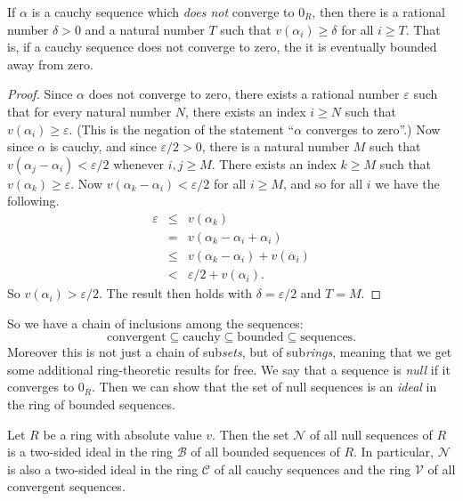 \begin{prop} \label{prop:cauchy-bound-away-from-zero}
If \(\alpha\) is a cauchy sequence which \emph{does not} converge to \(0_R\), then there is a rational number \(\delta > 0\) and a natural number \(T\) such that \(v(\alpha_i) \geq \delta\) for all \(i \geq T\).
That is, if a cauchy sequence does not converge to zero, the it is eventually bounded away from zero.
\end{prop}

\begin{proof}
Since \(\alpha\) does not converge to zero, there exists a rational number \(\varepsilon\) such that for every natural number \(N\), there exists an index \(i \geq N\) such that \(v(\alpha_i) \geq \varepsilon\).
(This is the negation of the statement ``\(\alpha\) converges to zero''.)
Now since \(\alpha\) is cauchy, and since \(\varepsilon/2 > 0\), there is a natural number \(M\) such that \(v(\alpha_j - \alpha_i) < \varepsilon/2\) whenever \(i,j \geq M\).
There exists an index \(k \geq M\) such that \(v(\alpha_k) \geq \varepsilon\).
Now \(v(\alpha_k - \alpha_i) < \varepsilon/2\) for all \(i \geq M\), and so for all \(i\) we have the following.
\begin{eqnarray*}
\varepsilon & \leq & v(\alpha_k) \\
 & = & v(\alpha_k - \alpha_i + \alpha_i) \\
 & \leq & v(\alpha_k - \alpha_i) + v(\alpha_i) \\
 & < & \varepsilon/2 + v(\alpha_i).
\end{eqnarray*}
So \(v(\alpha_i) > \varepsilon/2\).
The result then holds with \(\delta = \varepsilon/2\) and \(T = M\). 
\end{proof}

So we have a chain of inclusions among the sequences: \[ \mathrm{convergent} \subseteq \mathrm{cauchy} \subseteq \mathrm{bounded} \subseteq \mathrm{sequences}. \]
Moreover this is not just a chain of sub\emph{sets}, but of sub\emph{rings}, meaning that we get some additional ring-theoretic results for free.
We say that a sequence is \emph{null} if it converges to \(0_R\).
Then we can show that the set of null sequences is an \emph{ideal} in the ring of bounded sequences.

\begin{prop}
Let \(R\) be a ring with absolute value \(v\).
Then the set \(\mathcal{N}\) of all null sequences of \(R\) is a two-sided ideal in the ring \(\mathcal{B}\) of all bounded sequences of \(R\).
In particular, \(\mathcal{N}\) is also a two-sided ideal in the ring \(\mathcal{C}\) of all cauchy sequences and the ring \(\mathcal{V}\) of all convergent sequences.
\end{prop}

